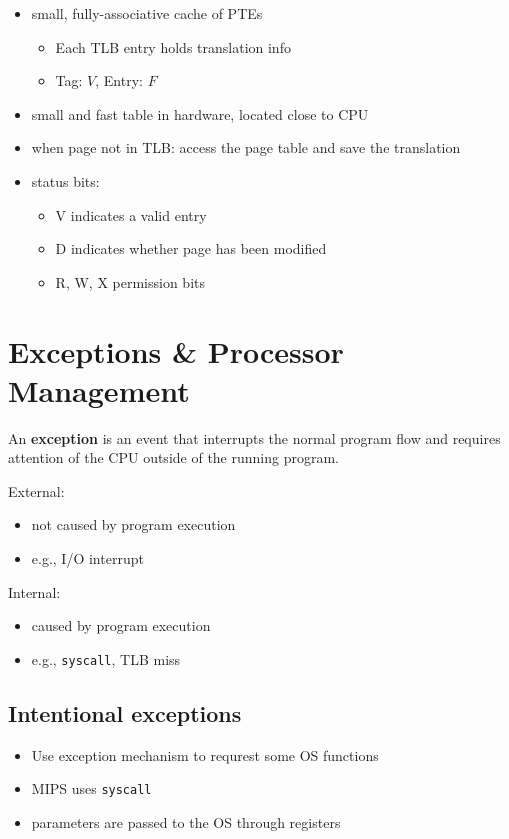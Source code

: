 \documentclass{article}
\newcommand{\T}[1]{\texttt{#1}}
\begin{document}
\begin{itemize}
	\item small, fully-associative cache of PTEs \begin{itemize}
		      \item Each TLB entry holds translation info
		      \item Tag: $V$, Entry: $F$
	      \end{itemize}
	\item small and fast table in hardware, located close to CPU
	\item when page not in TLB: access the page table and save the translation
	\item status bits: \begin{itemize}
		      \item V indicates a valid entry
		      \item D indicates whether page has been modified
		      \item R, W, X permission bits
	      \end{itemize}
\end{itemize}

\section{Exceptions \& Processor Management}

\begin{definition}
	An \textbf{exception} is an event that interrupts the normal program flow
	and requires attention of the CPU outside of the running program.
\end{definition}

External:
\begin{itemize}
	\item not caused by program execution
	\item e.g., I/O interrupt
\end{itemize}

Internal:
\begin{itemize}
	\item caused by program execution
	\item e.g., \T{syscall}, TLB miss
\end{itemize}

\subsection{Intentional exceptions}

\begin{itemize}
	\item Use exception mechanism to requrest some OS functions
	\item MIPS uses \T{syscall}
	\item parameters are passed to the OS through registers
\end{itemize}
\end{document}
